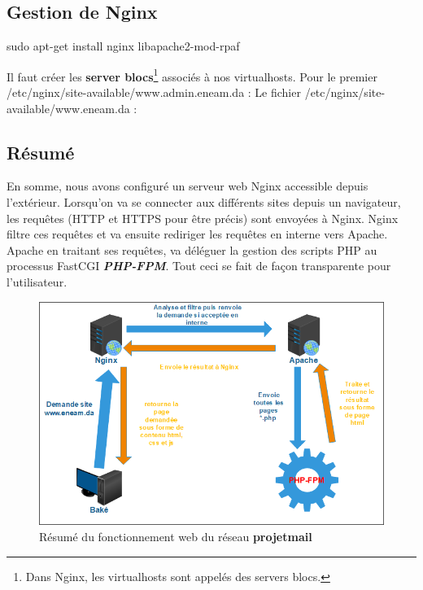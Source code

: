 \documentclass[a4paper,12pt,french]{report} %
\begin{document}
\subsection{Gestion de Nginx}
\begin{exempleConsole}
sudo apt-get install nginx libapache2-mod-rpaf
\end{exempleConsole}

Il faut créer les  \textbf{server blocs}\footnote{Dans Nginx, les virtualhosts sont appelés des servers blocs.} associés à nos virtualhosts. Pour le premier /etc/nginx/site-available/www.admin.eneam.da :
Le fichier /etc/nginx/site-available/www.eneam.da :

\subsection*{Résumé}
En somme, nous avons configuré un serveur web Nginx accessible depuis l'extérieur. Lorsqu'on va se connecter aux différents sites depuis un navigateur, les requêtes (HTTP et HTTPS pour être précis) sont envoyées à Nginx. Nginx filtre  ces requêtes et va ensuite rediriger les requêtes en interne vers Apache. Apache en traitant ses requêtes, va déléguer la gestion des scripts PHP au processus FastCGI \emph{\textbf{PHP-FPM}}. Tout ceci se fait de façon transparente pour l'utilisateur.
\begin{figure}[H]
	\centering
	\includegraphics[scale=0.7]{figure/resume-fonctionnement-web-eneam.png}
	\caption{Résumé du fonctionnement web du réseau \textbf{projetmail}}
\end{figure}
\end{document}
